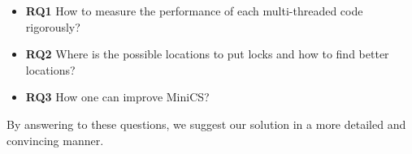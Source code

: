 \vspace{0.2cm}

\begin{itemize}
	\setlength\itemsep{0.5em}
	\item[] \textbf{RQ1} How to measure the performance of each multi-threaded code rigorously?
	\item[] \textbf{RQ2} Where is the possible locations to put locks and how to find better locations?
	\item[] \textbf{RQ3} How one can improve MiniCS?
\end{itemize}

By answering to these questions, we suggest our solution in a more detailed and convincing manner.